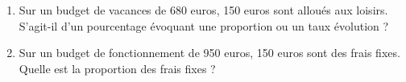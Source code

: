 
\begin{enumerate}
\item Sur un budget de vacances de 680 euros, 150 euros sont alloués aux loisirs. S'agit-il d'un pourcentage évoquant une proportion ou un taux évolution ?
\item Sur un budget de fonctionnement de 950 euros, 150 euros sont des frais fixes. Quelle est la proportion des frais fixes ?  
\end{enumerate}
